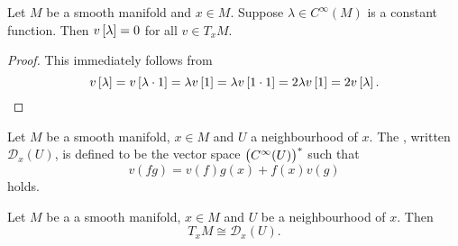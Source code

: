 \begin{lemma}
	\label{lem:derivation_of_constant_germ}
	Let $M$ be a smooth manifold and $x \in M$. Suppose $\lambda \in C^\infty(M)$ is a constant function. Then $v\sbr{\lambda} = 0$ for all $v \in T_xM$.
\end{lemma}

\begin{proof}
	This immediately follows from
	\begin{equation*}
		v\sbr{\lambda} = v\sbr{\lambda \cdot 1} = \lambda v\sbr{1} = \lambda v\sbr{1 \cdot 1} = 2\lambda v\sbr{1} = 2 v\sbr{\lambda}.
	\end{equation*}
\end{proof}

\begin{definition}[Derivation]
	Let $M$ be a smooth manifold, $x \in M$ and $U$ a neighbourhood of $x$. The , written $\mathcal{D}_x(U)$, is defined to be the vector space $\del[1]{C^\infty(U)}^*$ such that
	\begin{equation*}
		v(fg) = v(f)g(x) + f(x)v(g)
	\end{equation*}
	\noindent holds.
\end{definition}

\begin{proposition}
	\label{prop:isomorphism_tangent_space}
	Let $M$ be a a smooth manifold, $x \in M$ and $U$ be a neighbourhood of $x$. Then
	\begin{equation*}
		T_xM \cong \mathcal{D}_x(U).
	\end{equation*}
\end{proposition}

